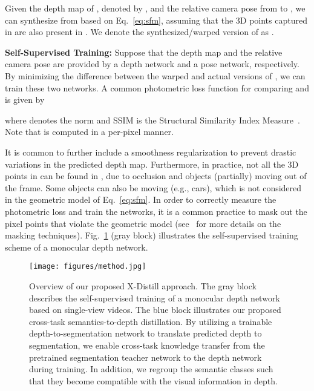 \documentclass{bmvc2k}
\newcommand{\rev}{}
\begin{document}
\rev{Given the depth map} of , denoted by , and the relative camera pose from  to , we can synthesize  from  based on Eq.~\ref{eq:sfm}, assuming that the 3D points captured in  are also present in . We denote the synthesized/warped version of  as .

\noindent \textbf{Self-Supervised Training:} Suppose that the depth map and the relative camera pose are provided by a depth network and a pose network, respectively. By minimizing the difference between the warped and actual versions of , we can train these two networks. A common photometric loss function for comparing  and  is given by\vspace{-7pt}

where  denotes the  norm and SSIM is the Structural Similarity Index Measure~\cite{wang2004image}. Note that  is computed in a per-pixel manner.

It is common to further include a smoothness regularization to prevent drastic variations in the predicted depth map. Furthermore, in practice, not all the 3D points in  can be found in , due to occlusion and objects (partially) moving out of the frame. Some objects can also be moving (e.g., cars), which is not considered in the geometric model of Eq.~\ref{eq:sfm}. In order to correctly measure the photometric loss and train the networks, it is a common practice to mask out the pixel points that violate the geometric model (see~\cite{godard2019digging} for more details on the masking techniques). Fig.~\ref{fig:overview} (gray block) illustrates the self-supervised training scheme of a monocular depth network.


\begin{figure}[t!]
\centering
\texttt{[image: figures/method.jpg]}
\vspace{-5pt}
\caption{\small Overview of our proposed X-Distill approach. The gray block describes the self-supervised training of a monocular depth network based on single-view videos. The blue block illustrates our proposed cross-task semantics-to-depth distillation. By utilizing a trainable depth-to-segmentation network to translate predicted depth to segmentation, we enable cross-task knowledge transfer from the pretrained segmentation teacher network to the depth network during training. In addition, we regroup the semantic classes such that they become compatible with the visual information in depth.} 
\label{fig:overview}
\vspace{-12pt}
\end{figure}
\end{document}
